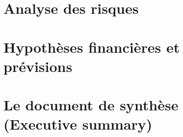 \documentclass[a4paper,12pt]{report}
\begin{document}
\section{Analyse des risques}
\section{Hypothèses financières et prévisions}
\section{Le document de synthèse (Executive summary)}
\end{document}
